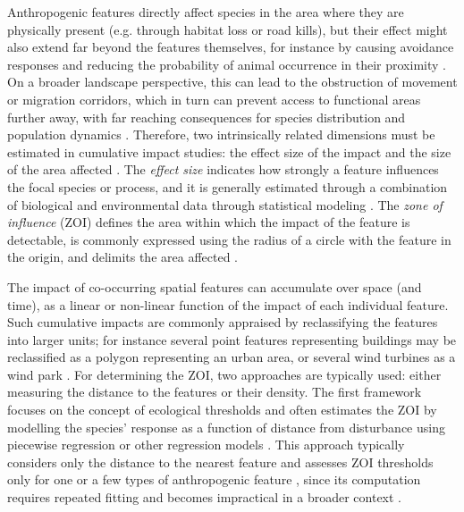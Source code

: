 \documentclass[titlepage]{article}
\begin{document}
Anthropogenic features directly affect species in the area where they are physically present (e.g. through habitat loss or road kills), but their effect might also extend far beyond the features themselves, for instance by causing avoidance responses and reducing the probability of animal occurrence in their proximity \citep[][]{johnson_cumulative_2005,torres_assessing_2016}. On a broader landscape perspective, this can lead to the obstruction of movement or migration corridors, which in turn can prevent access to functional areas further away, with far reaching consequences for species distribution and population dynamics \citep[][in press]{panzacchi_predicting_2016,dorber_indicators_2023,van_moorter_defining_2021,van_moorter_accelerating_2023}. Therefore, two intrinsically related dimensions must be estimated in cumulative impact studies: the effect size of the impact and the size of the area affected \citep[Box 1; ][]{naugle_unifying_2011}. The \textit{effect size} indicates how strongly a feature influences the focal species or process, and it is generally estimated through a combination of biological and environmental data through statistical modeling \citep[Box 1;][]{polfus_identifying_2011}. The \textit{zone of influence} (ZOI) defines the area within which the impact of the feature is detectable, is commonly expressed using the radius of a circle with the feature in the origin, and delimits the area affected \citep[Box 1;][]{boulanger_estimation_2021,polfus_identifying_2011}. 

The impact of co-occurring spatial features can accumulate over space (and time), as a linear or non-linear function of the impact of each individual feature. Such cumulative impacts are commonly appraised by reclassifying the features into larger units; for instance several point features representing buildings may be reclassified as a polygon representing an urban area, or several wind turbines as a wind park \citep{torres_assessing_2016}.
For determining the ZOI, two approaches are typically used: either measuring the distance to the features or their density. The first framework focuses on the concept of ecological thresholds \citep[][]{ficetola_ecological_2009} and often estimates the ZOI by modelling the species’ response as a function of distance from disturbance using piecewise regression or other regression models \citep[e.g. exponential decay or generalized additive models;][]{ficetola_ecological_2009,skarin_out_2018}. This approach typically considers only the distance to the nearest feature and assesses ZOI thresholds only for one or a few types of anthropogenic feature \citep[e.g.][]{boulanger_estimation_2021}, since its computation requires repeated fitting and becomes impractical in a broader context \citep{lee_estimating_2020}. 
\end{document}
